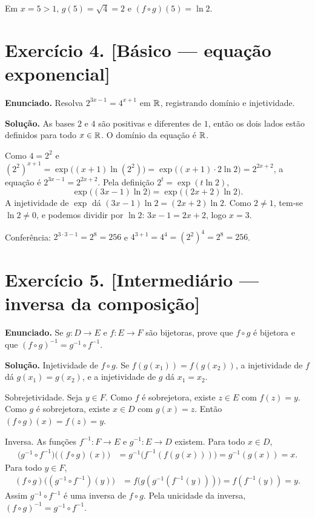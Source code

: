 \documentclass[11pt,a4paper]{article}
\begin{document}
Em $x=5>1$, $g(5)=\sqrt{4}=2$ e $(f\circ g)(5)=\ln 2$.

\section*{Exercício 4. [Básico --- equação exponencial]}

\textbf{Enunciado.} Resolva $2^{3x-1}=4^{x+1}$ em $\mathbb{R}$, registrando domínio e injetividade.

\textbf{Solução.}
As bases $2$ e $4$ são positivas e diferentes de $1$, então os dois lados estão definidos para todo $x\in\mathbb{R}$. O domínio da equação é $\mathbb{R}$.

Como $4=2^2$ e $(2^2)^{x+1}=\exp\bigl((x+1)\ln(2^2)\bigr)=\exp\bigl((x+1)\cdot 2\ln 2\bigr)=2^{2x+2}$, a equação é $2^{3x-1}=2^{2x+2}$. Pela definição $2^{t}=\exp(t\ln 2)$,
\[
\exp\bigl((3x-1)\ln 2\bigr)=\exp\bigl((2x+2)\ln 2\bigr).
\]
A injetividade de $\exp$ dá $(3x-1)\ln 2=(2x+2)\ln 2$. Como $2\neq 1$, tem-se $\ln 2\neq 0$, e podemos dividir por $\ln 2$: $3x-1=2x+2$, logo $x=3$.

Conferência: $2^{3\cdot 3-1}=2^{8}=256$ e $4^{3+1}=4^{4}=(2^{2})^{4}=2^{8}=256$.

\section*{Exercício 5. [Intermediário --- inversa da composição]}

\textbf{Enunciado.} Se $g\colon D\to E$ e $f\colon E\to F$ são bijetoras, prove que $f\circ g$ é bijetora e que $(f\circ g)^{-1}=g^{-1}\circ f^{-1}$.

\textbf{Solução.}
Injetividade de $f\circ g$. Se $f(g(x_1))=f(g(x_2))$, a injetividade de $f$ dá $g(x_1)=g(x_2)$, e a injetividade de $g$ dá $x_1=x_2$.

Sobrejetividade. Seja $y\in F$. Como $f$ é sobrejetora, existe $z\in E$ com $f(z)=y$. Como $g$ é sobrejetora, existe $x\in D$ com $g(x)=z$. Então $(f\circ g)(x)=f(z)=y$.

Inversa. As funções $f^{-1}\colon F\to E$ e $g^{-1}\colon E\to D$ existem. Para todo $x\in D$,
\begin{align*}
\bigl(g^{-1}\circ f^{-1}\bigr)\bigl((f\circ g)(x)\bigr)
&=g^{-1}\bigl(f^{-1}(f(g(x)))\bigr)
=g^{-1}(g(x))
=x.
\end{align*}
Para todo $y\in F$,
\begin{align*}
(f\circ g)\bigl((g^{-1}\circ f^{-1})(y)\bigr)
&=f\bigl(g(g^{-1}(f^{-1}(y)))\bigr)
=f(f^{-1}(y))
=y.
\end{align*}
Assim $g^{-1}\circ f^{-1}$ é uma inversa de $f\circ g$. Pela unicidade da inversa, $(f\circ g)^{-1}=g^{-1}\circ f^{-1}$.
\end{document}

